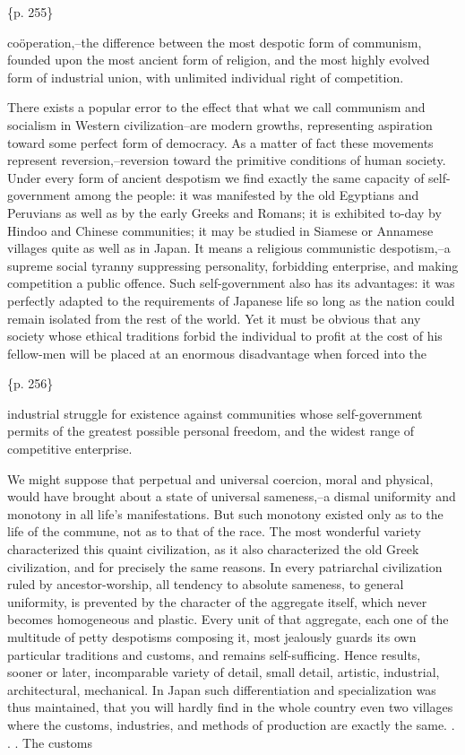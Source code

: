 \{p. 255\}

coöperation,--the difference between the most despotic form of communism, founded upon the most ancient form of religion, and the most highly evolved form of industrial union, with unlimited individual right of competition.

There exists a popular error to the effect that what we call communism and socialism in Western civilization--are modern growths, representing aspiration toward some perfect form of democracy. As a matter of fact these movements represent reversion,--reversion toward the primitive conditions of human society. Under every form of ancient despotism we find exactly the same capacity of self-government among the people: it was manifested by the old Egyptians and Peruvians as well as by the early Greeks and Romans; it is exhibited to-day by Hindoo and Chinese communities; it may be studied in Siamese or Annamese villages quite as well as in Japan. It means a religious communistic despotism,--a supreme social tyranny suppressing personality, forbidding enterprise, and making competition a public offence. Such self-government also has its advantages: it was perfectly adapted to the requirements of Japanese life so long as the nation could remain isolated from the rest of the world. Yet it must be obvious that any society whose ethical traditions forbid the individual to profit at the cost of his fellow-men will be placed at an enormous disadvantage when forced into the

\{p. 256\}

industrial struggle for existence against communities whose self-government permits of the greatest possible personal freedom, and the widest range of competitive enterprise.



We might suppose that perpetual and universal coercion, moral and physical, would have brought about a state of universal sameness,--a dismal uniformity and monotony in all life's manifestations. But such monotony existed only as to the life of the commune, not as to that of the race. The most wonderful variety characterized this quaint civilization, as it also characterized the old Greek civilization, and for precisely the same reasons. In every patriarchal civilization ruled by ancestor-worship, all tendency to absolute sameness, to general uniformity, is prevented by the character of the aggregate itself, which never becomes homogeneous and plastic. Every unit of that aggregate, each one of the multitude of petty despotisms composing it, most jealously guards its own particular traditions and customs, and remains self-sufficing. Hence results, sooner or later, incomparable variety of detail, small detail, artistic, industrial, architectural, mechanical. In Japan such differentiation and specialization was thus maintained, that you will hardly find in the whole country even two villages where the customs, industries, and methods of production are exactly the same. . . . The customs

